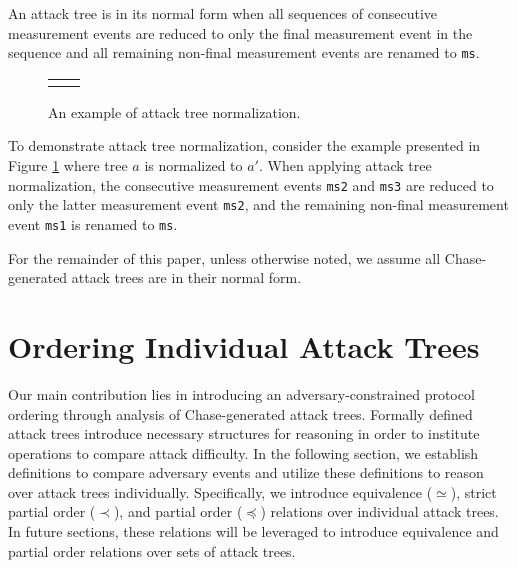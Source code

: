 \documentclass[runningheads]{llncs}
\theoremstyle{definition}
\begin{document}
\begin{definition}
    An attack tree is in its normal form when all sequences of consecutive measurement events are reduced to only the final measurement event in the sequence and all remaining non-final measurement events are renamed to \texttt{ms}. 
\end{definition}

\begin{figure}[htbp]
  \centering 
  \begin{tabular}{c c}
       &  
  \end{tabular}
  \captionsetup{justification=centering,margin=1cm}
  \caption[Example of attack tree normalization]{An example of attack tree normalization.}
  \label{fig:reduce-ex}
\end{figure}


\noindent To demonstrate attack tree normalization, consider the example presented in Figure \ref{fig:reduce-ex} where tree $a$ is normalized to $a'$. When applying attack tree normalization, the consecutive measurement events \texttt{ms2} and \texttt{ms3} are reduced to only the latter measurement event \texttt{ms2}, and the remaining non-final measurement event \texttt{ms1} is renamed to \texttt{ms}.

For the remainder of this paper, unless otherwise noted, we assume all Chase-generated attack trees are in their normal form.


\section{Ordering Individual Attack Trees}

Our main contribution lies in introducing an adversary-constrained protocol ordering through analysis of Chase-generated attack trees. Formally defined attack trees introduce necessary structures for reasoning in order to institute operations to compare attack difficulty. In the following section, we establish definitions to compare adversary events and utilize these definitions to reason over attack trees individually. Specifically, we introduce equivalence ($\simeq$), strict partial order ($\prec$), and partial order ($\preceq$) relations over individual attack trees. In future sections, these relations will be leveraged to introduce equivalence and partial order relations over sets of attack trees.
\end{document}
